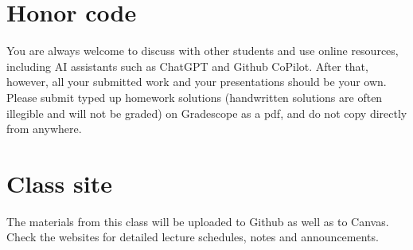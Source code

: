 \documentclass[12pt]{article}
\begin{document}
\section{Honor code}
You are always welcome to discuss with other students and use online resources, including AI assistants such as ChatGPT and Github CoPilot. After that, however, all your submitted work and your presentations should be your own. 
Please submit typed up homework solutions (handwritten solutions are often illegible and will not be graded) on Gradescope as a pdf, and do not copy directly from anywhere.

\section{Class site}
The materials from this class will be uploaded to Github as well as to Canvas. Check the websites for detailed lecture schedules, notes and announcements.
\end{document}
